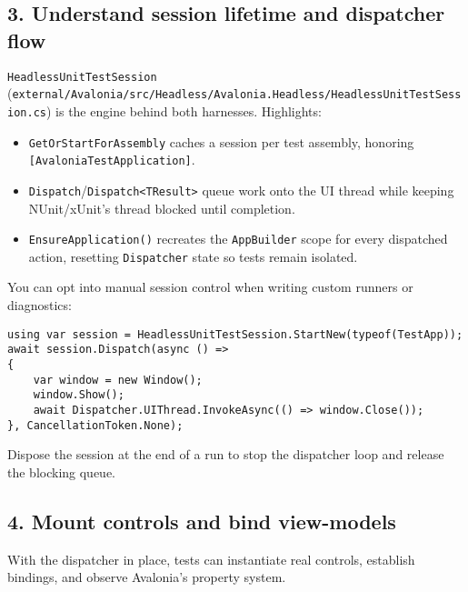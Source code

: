 \subsection{3. Understand session lifetime and dispatcher
flow}\label{understand-session-lifetime-and-dispatcher-flow}

\passthrough{\lstinline!HeadlessUnitTestSession!}
(\passthrough{\lstinline!external/Avalonia/src/Headless/Avalonia.Headless/HeadlessUnitTestSession.cs!})
is the engine behind both harnesses. Highlights:

\begin{itemize}
\tightlist
\item
  \passthrough{\lstinline!GetOrStartForAssembly!} caches a session per
  test assembly, honoring
  \passthrough{\lstinline![AvaloniaTestApplication]!}.
\item
  \passthrough{\lstinline!Dispatch!}/\passthrough{\lstinline!Dispatch<TResult>!}
  queue work onto the UI thread while keeping NUnit/xUnit's thread
  blocked until completion.
\item
  \passthrough{\lstinline!EnsureApplication()!} recreates the
  \passthrough{\lstinline!AppBuilder!} scope for every dispatched
  action, resetting \passthrough{\lstinline!Dispatcher!} state so tests
  remain isolated.
\end{itemize}

You can opt into manual session control when writing custom runners or
diagnostics:

\begin{lstlisting}
using var session = HeadlessUnitTestSession.StartNew(typeof(TestApp));
await session.Dispatch(async () =>
{
    var window = new Window();
    window.Show();
    await Dispatcher.UIThread.InvokeAsync(() => window.Close());
}, CancellationToken.None);
\end{lstlisting}

Dispose the session at the end of a run to stop the dispatcher loop and
release the blocking queue.

\subsection{4. Mount controls and bind
view-models}\label{mount-controls-and-bind-view-models}

With the dispatcher in place, tests can instantiate real controls,
establish bindings, and observe Avalonia's property system.

